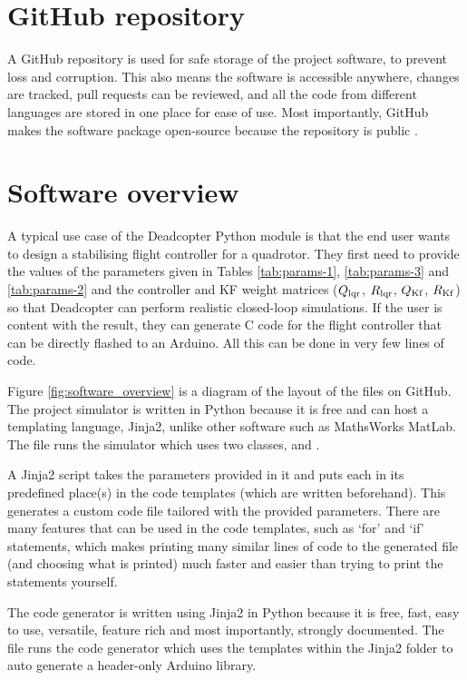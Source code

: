\section{GitHub repository}\label{sec:github_repository}
A GitHub repository is used for safe storage of the project software, to prevent loss and corruption. This also means the software is accessible anywhere, changes are tracked, pull requests can be reviewed, and all the code from different languages are stored in one place for ease of use. Most importantly, GitHub makes the software package open-source because the repository is public \cite{deadcopter}.








\section{Software overview}
A typical use case of the Deadcopter Python module is that the end user wants to design a stabilising flight controller for a quadrotor. They first need to provide the values of the parameters given in Tables \ref{tab:params-1}, \ref{tab:params-3} and \ref{tab:params-2} and the controller and KF weight matrices ($Q_{\rm{lqr}}$, $R_{\rm{lqr}}$, $Q_{\rm{Kf}}$, $R_{\rm{Kf}}$) so that Deadcopter can perform realistic closed-loop simulations. If the user is content with the result, they can generate C code for the flight controller that can be directly flashed to an Arduino. All this can be done in very few lines of code.

Figure \ref{fig:software_overview} is a diagram of the layout of the files on GitHub. The project simulator is written in Python because it is free and can host a templating language, Jinja2, unlike other software such as MathsWorks MatLab. The  file runs the simulator which uses two classes,  and .

A Jinja2 script takes the parameters provided in it and puts each in its predefined place(s) in the code templates (which are written beforehand). This generates a custom code file tailored with the provided parameters. There are many features that can be used in the code templates, such as `for' and `if' statements, which makes printing many similar lines of code to the generated file (and choosing what is printed) much faster and easier than trying to print the statements yourself.

The code generator is written using Jinja2 in Python because it is free, fast, easy to use, versatile, feature rich and most importantly, strongly documented. The  file runs the code generator which uses the templates within the Jinja2 folder to auto generate a header-only Arduino library. 

